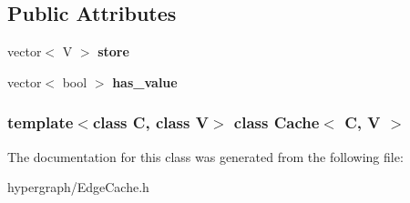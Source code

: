 \subsection*{Public Attributes}
\begin{DoxyCompactItemize}
\item 
\hypertarget{class_cache_a4de9009630d4bdc7e78b9db7ea734411}{
vector$<$ V $>$ {\bfseries store}}
\label{class_cache_a4de9009630d4bdc7e78b9db7ea734411}

\item 
\hypertarget{class_cache_a30fcdd51d6ff0cd602cc23d4a12b5348}{
vector$<$ bool $>$ {\bfseries has\_\-value}}
\label{class_cache_a30fcdd51d6ff0cd602cc23d4a12b5348}

\end{DoxyCompactItemize}
\subsubsection*{template$<$class C, class V$>$ class Cache$<$ C, V $>$}



The documentation for this class was generated from the following file:\begin{DoxyCompactItemize}
\item 
hypergraph/EdgeCache.h\end{DoxyCompactItemize}

